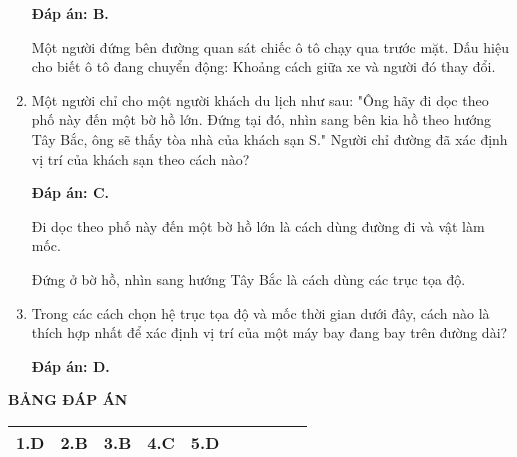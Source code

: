 \begin{enumerate}[label=\bfseries Câu \arabic*:]
	\loigiai
	{\textbf{Đáp án: B.}
		
	Một người đứng bên đường quan sát chiếc ô tô chạy qua trước mặt. Dấu hiệu cho biết ô tô đang chuyển động: Khoảng cách giữa xe và người đó thay đổi. 
		
		
	}
		\item {}
	
	\cauhoi
	{Một người chỉ cho một người khách du lịch như sau: "Ông hãy đi dọc theo phố này đến một bờ hồ lớn. Đứng tại đó, nhìn sang bên kia hồ theo hướng Tây Bắc, ông sẽ thấy tòa nhà của khách sạn S." Người chỉ đường đã xác định vị trí của khách sạn theo cách nào?
	}
	
	\loigiai
	{\textbf{Đáp án: C.}
		
	Đi dọc theo phố này đến một bờ hồ lớn là cách dùng đường đi và vật làm mốc.
	
	Đứng ở bờ hồ, nhìn sang hướng Tây Bắc là cách dùng các trục tọa độ.
		
		
	}
	\item {}
	
	\cauhoi
	{Trong các cách chọn hệ trục tọa độ và mốc thời gian dưới đây, cách nào là thích hợp nhất để xác định vị trí của một máy bay đang bay trên đường dài?
	}
	
	\loigiai
	{\textbf{Đáp án: D.}		
		
	}
	
\end{enumerate}

\whiteBGstarEnd

\loigiai
{
	\begin{center}
		\textbf{BẢNG ĐÁP ÁN}
	\end{center}
	\begin{center}
		\begin{tabular}{|m{2.8em}|m{2.8em}|m{2.8em}|m{2.8em}|m{2.8em}|m{2.8em}|m{2.8em}|m{2.8em}|m{2.8em}|m{2.8em}|}
			\hline
			1.D  & 2.B  & 3.B  & 4.C  & 5.D  &   &  &  &  &  \\
			\hline
			
		\end{tabular}
	\end{center}
}
